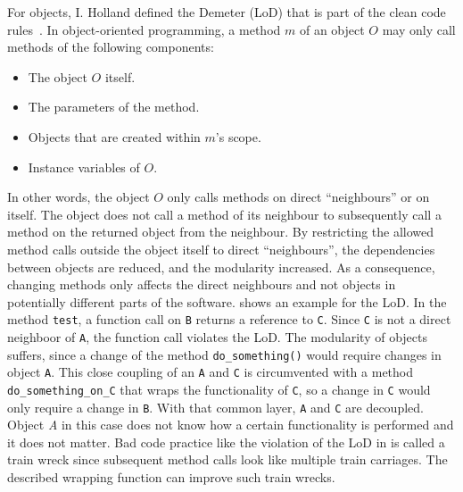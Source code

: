 For objects, I. Holland defined the Demeter (LoD) that is part of the clean code rules~\cite{lieberherr_assuring_1989}.
In object-oriented programming, a method $m$ of an object $O$ may only call methods of the following components:
\begin{itemize}
    \item The object $O$ itself.
    \item The parameters of the method.
    \item Objects that are created within $m$'s scope.
    \item Instance variables of $O$.
\end{itemize}
In other words, the object $O$ only calls methods on direct \enquote{neighbours} or on itself. The object does not call a method of its neighbour to subsequently call a method on the returned object from the neighbour. By restricting the allowed method calls outside the object itself to direct \enquote{neighbours}, the dependencies between objects are reduced, and the modularity increased. As a consequence, changing methods only affects the direct neighbours and not objects in potentially different parts of the software. 
 shows an example for the LoD. In the method \texttt{test}, a function call on \texttt{B} returns a reference to \texttt{C}. Since \texttt{C} is not a direct neighboor of \texttt{A}, the function call violates the LoD. The modularity of objects suffers, since a change of the method \texttt{do\_something()} would require changes in object \texttt{A}. This close coupling of an \texttt{A} and \texttt{C} is circumvented with a method \texttt{do\_something\_on\_C} that wraps the functionality of \texttt{C}, so a change in \texttt{C} would only require a change in \texttt{B}. With that common layer, \texttt{A} and \texttt{C} are decoupled. Object \textit{A} in this case does not know how a certain functionality is performed and it does not matter.  
Bad code practice like the violation of the LoD in  is called a train wreck since subsequent method calls look like multiple train carriages. The described wrapping function can improve such train wrecks.

